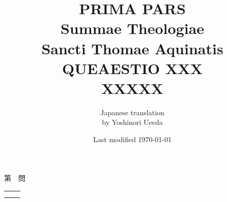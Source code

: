 \documentclass[10pt]{jsarticle} %
\title{{\bf PRIMA PARS}\\{\HUGE Summae Theologiae}\\Sancti Thomae
Aquinatis\\{\sffamily QUEAESTIO XXX}\\XXXXX}
\author{Japanese translation\\by Yoshinori {\sc Ueeda}}
\date{Last modified \today}
\begin{document}
\maketitle
\pagestyle{fancy}

\begin{center}
{\Large 第　問\\}
\end{center}

\begin{longtable}{p{21em}p{21em}}


&



\\

&


\end{longtable}

\newpage
\end{document}
